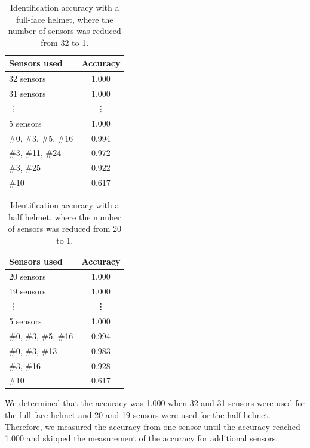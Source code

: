 \documentclass[english,preprint,JIP]{ipsj}
\begin{document}
\begin{table}[!t]
\centering
  \caption{Identification accuracy with a full-face helmet, where the number of sensors was reduced from 32 to 1.}
    \label{tab:full_num}
  \begin{tabular}{l|c} \hline\hline
    Sensors used & Accuracy \\ \hline
    32 sensors & 1.000 \\
    31 sensors & 1.000 \\
    \vdots & \vdots \\
    5 sensors & 1.000 \\
    $\#$0, $\#$3, $\#$5, $\#$16 & 0.994 \\
    $\#$3, $\#$11, $\#$24       & 0.972 \\
    $\#$3, $\#$25               & 0.922 \\
    $\#$10                      & 0.617 \\ \hline
  \end{tabular}
\end{table}

\begin{table}[!t]
 \centering
  \caption{Identification accuracy with a half helmet, where the number of sensors was reduced from 20 to 1.}
    \label{tab:half_num}
  \begin{tabular}{l|c} \hline\hline
    Sensors used & Accuracy \\ \hline
    20 sensors & 1.000 \\
    19 sensors & 1.000 \\
    \vdots & \vdots \\
    5 sensors & 1.000 \\
    $\#$0, $\#$3, $\#$5, $\#$16 & 0.994 \\
    $\#$0, $\#$3, $\#$13        & 0.983 \\
    $\#$3, $\#$16               & 0.928 \\
    $\#$10                      & 0.617 \\ \hline
  \end{tabular}
\end{table}

We determined that the accuracy was 1.000 when 32 and 31 sensors were used for the full-face helmet and 20 and 19 sensors were used for the half helmet. Therefore, we measured the accuracy from one sensor until the accuracy reached 1.000 and skipped the measurement of the accuracy for additional sensors.\par
\end{document}
